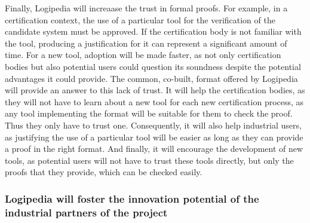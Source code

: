 Finally, Logipedia will increaase the trust in formal proofs. For
example, in a certification context, the use of a particular tool for
the verification of the candidate system must be approved. If the
certification body is not familiar with the tool, producing a
justification for it can represent a significant amount of time. For a
new tool, adoption will be made faster, as not only certification
bodies but also potential users could question its soundness despite
the potential advantages it could provide. The common, co-built,
format offered by Logipedia will provide an answer to this lack of
trust. It will help the certification bodies, as they will not have to
learn about a new tool for each new certification process, as any tool
implementing the format will be suitable for them to check the
proof. Thus they only have to trust one. Consequently, it will also
help industrial users, as justifying the use of a particular tool will
be easier as long as they can provide a proof in the right format. And
finally, it will encourage the development of new tools, as potential
users will not have to trust these tools directly, but only the proofs
that they provide, which can be checked easily.

\subsubsection*{Logipedia will foster the innovation potential of the 
  industrial partners of the project} 

